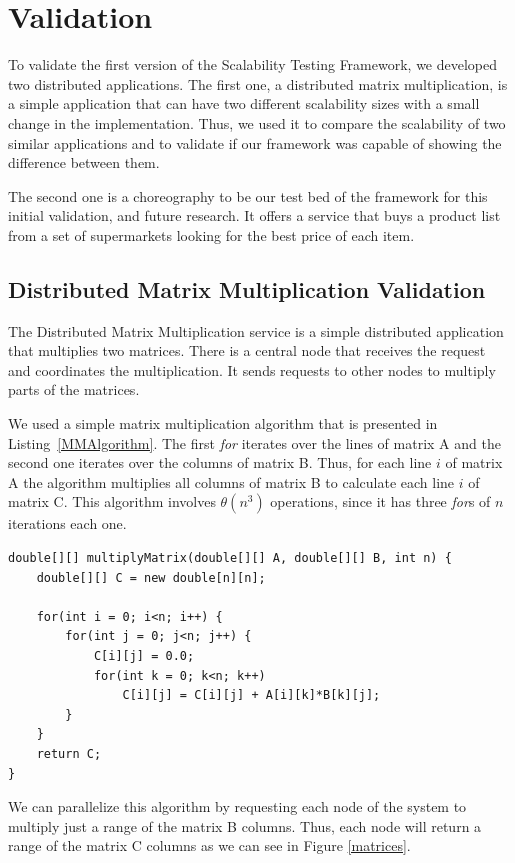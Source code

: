 \section{Validation}
To validate the first version of the Scalability Testing Framework, we developed two distributed applications. The first one, a distributed matrix multiplication, is a simple application that can have two different scalability sizes with a small change in the implementation. Thus, we used it to compare the scalability of two similar applications and to validate if our framework was capable of showing the difference between them.

The second one is a choreography to be our test bed of the framework for this initial validation, and future research. It offers a service that buys a product list from a set of supermarkets looking for the best price of each item.

\subsection{Distributed Matrix Multiplication Validation}

The Distributed Matrix Multiplication service is a simple distributed application that multiplies two matrices. There is a central node that receives the request and coordinates the multiplication. It sends requests to other nodes to multiply parts of the matrices.

We used a simple matrix multiplication algorithm that is presented in Listing~\ref{MMAlgorithm}. The first \emph{for} iterates over the lines of matrix A and the second one iterates over the columns of matrix B. Thus, for each line $i$ of matrix A the algorithm multiplies all columns of matrix B to calculate each line $i$ of matrix C. This algorithm involves $\theta(n^3)$ operations, since it has three \emph{for}s of $n$ iterations each one.
\begin{lstlisting}
double[][] multiplyMatrix(double[][] A, double[][] B, int n) {
	double[][] C = new double[n][n];
	
	for(int i = 0; i<n; i++) {
		for(int j = 0; j<n; j++) {
			C[i][j] = 0.0;
			for(int k = 0; k<n; k++)
				C[i][j] = C[i][j] + A[i][k]*B[k][j];
		}
	}
	return C;
}
\end{lstlisting}

We can parallelize this algorithm by requesting each node of the system to multiply just a range of the matrix B columns. Thus, each node will return a range of the matrix C columns as we can see in Figure \ref{matrices}.

